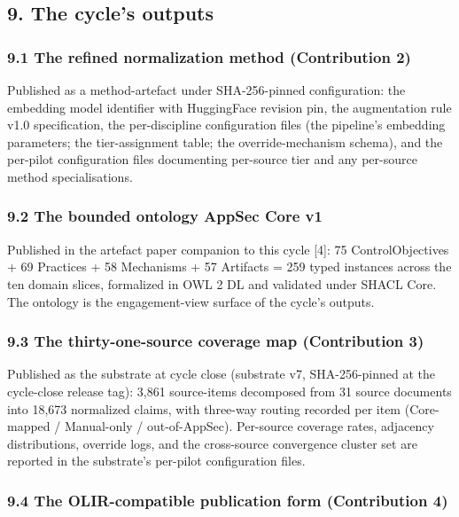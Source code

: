 \documentclass[
]{article}
\begin{document}
\subsection{9. The cycle's outputs}\label{the-cycles-outputs}

\subsubsection{9.1 The refined normalization method (Contribution
2)}\label{the-refined-normalization-method-contribution-2}

Published as a method-artefact under SHA-256-pinned configuration: the
embedding model identifier with HuggingFace revision pin, the
augmentation rule v1.0 specification, the per-discipline configuration
files (the pipeline's embedding parameters; the tier-assignment table;
the override-mechanism schema), and the per-pilot configuration files
documenting per-source tier and any per-source method specialisations.

\subsubsection{9.2 The bounded ontology AppSec Core
v1}\label{the-bounded-ontology-appsec-core-v1}

Published in the artefact paper companion to this cycle {[}4{]}: 75
ControlObjectives + 69 Practices + 58 Mechanisms + 57 Artifacts = 259
typed instances across the ten domain slices, formalized in OWL 2 DL and
validated under SHACL Core. The ontology is the engagement-view surface
of the cycle's outputs.

\subsubsection{9.3 The thirty-one-source coverage map (Contribution
3)}\label{the-thirty-one-source-coverage-map-contribution-3}

Published as the substrate at cycle close (substrate v7, SHA-256-pinned
at the cycle-close release tag): 3,861 source-items decomposed from 31
source documents into 18,673 normalized claims, with three-way routing
recorded per item (Core-mapped / Manual-only / out-of-AppSec).
Per-source coverage rates, adjacency distributions, override logs, and
the cross-source convergence cluster set are reported in the substrate's
per-pilot configuration files.

\subsubsection{9.4 The OLIR-compatible publication form (Contribution
4)}\label{the-olir-compatible-publication-form-contribution-4}
\end{document}

